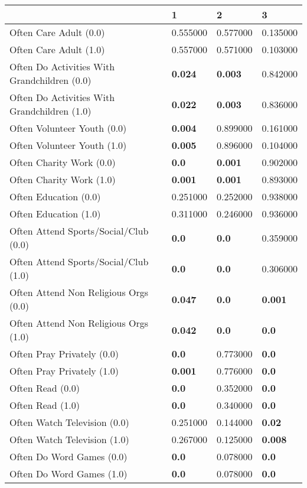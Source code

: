 \begin{tabular}{llll}
\toprule
 & 1 & 2 & 3 \\
\midrule
Often Care Adult (0.0) & 0.555000 & 0.577000 & 0.135000 \\
Often Care Adult (1.0) & 0.557000 & 0.571000 & 0.103000 \\
Often Do Activities With Grandchildren (0.0) & \textbf{0.024} & \textbf{0.003} & 0.842000 \\
Often Do Activities With Grandchildren (1.0) & \textbf{0.022} & \textbf{0.003} & 0.836000 \\
Often Volunteer Youth (0.0) & \textbf{0.004} & 0.899000 & 0.161000 \\
Often Volunteer Youth (1.0) & \textbf{0.005} & 0.896000 & 0.104000 \\
Often Charity Work (0.0) & \textbf{0.0} & \textbf{0.001} & 0.902000 \\
Often Charity Work (1.0) & \textbf{0.001} & \textbf{0.001} & 0.893000 \\
Often Education (0.0) & 0.251000 & 0.252000 & 0.938000 \\
Often Education (1.0) & 0.311000 & 0.246000 & 0.936000 \\
Often Attend Sports/Social/Club (0.0) & \textbf{0.0} & \textbf{0.0} & 0.359000 \\
Often Attend Sports/Social/Club (1.0) & \textbf{0.0} & \textbf{0.0} & 0.306000 \\
Often Attend Non Religious Orgs (0.0) & \textbf{0.047} & \textbf{0.0} & \textbf{0.001} \\
Often Attend Non Religious Orgs (1.0) & \textbf{0.042} & \textbf{0.0} & \textbf{0.0} \\
Often Pray Privately (0.0) & \textbf{0.0} & 0.773000 & \textbf{0.0} \\
Often Pray Privately (1.0) & \textbf{0.001} & 0.776000 & \textbf{0.0} \\
Often Read (0.0) & \textbf{0.0} & 0.352000 & \textbf{0.0} \\
Often Read (1.0) & \textbf{0.0} & 0.340000 & \textbf{0.0} \\
Often Watch Television (0.0) & 0.251000 & 0.144000 & \textbf{0.02} \\
Often Watch Television (1.0) & 0.267000 & 0.125000 & \textbf{0.008} \\
Often Do Word Games (0.0) & \textbf{0.0} & 0.078000 & \textbf{0.0} \\
Often Do Word Games (1.0) & \textbf{0.0} & 0.078000 & \textbf{0.0} \\

\end{tabular}
